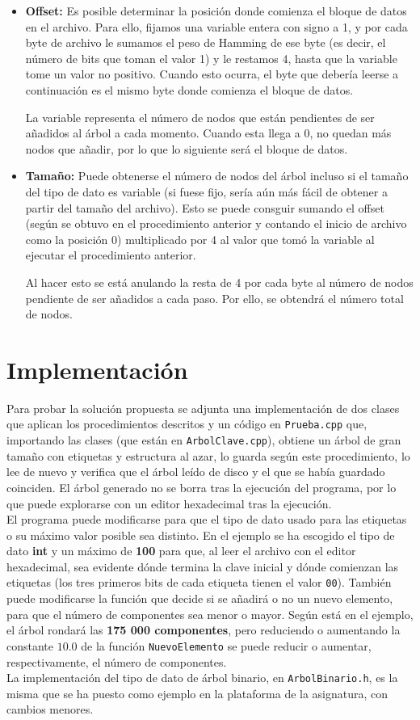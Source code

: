 \documentclass{article}
\begin{document}
\begin{itemize}
	\item \textbf{Offset:} Es posible determinar la posición donde comienza el
	bloque de datos en el archivo. Para ello, fijamos una variable entera con
	signo a 1, y por cada byte de archivo le sumamos el peso de Hamming de ese
	byte (es decir, el número de bits que toman el valor 1) y le restamos 4, hasta
	que la variable tome un valor no positivo. Cuando esto ocurra, el byte que
	debería leerse a continuación es el mismo byte donde comienza el bloque de
	datos.

	La variable representa el número de nodos que están pendientes de ser añadidos
	al árbol a cada momento. Cuando esta llega a 0, no quedan más nodos que añadir,
	por lo que lo siguiente será el bloque de datos.
	\item \textbf{Tamaño:} Puede obtenerse el número de nodos del árbol incluso
	si el tamaño del tipo de dato es variable (si fuese fijo, sería aún más fácil
	de obtener a partir del tamaño del archivo). Esto se puede consguir sumando el
	offset (según se obtuvo en el procedimiento anterior y contando el inicio de
	archivo como la posición 0) multiplicado por 4 al valor que tomó la variable al
	ejecutar el procedimiento anterior.

	Al hacer esto se está anulando la resta de 4 por cada byte al número de nodos
	pendiente de ser añadidos a cada paso. Por ello, se obtendrá el número total
	de nodos.
\end{itemize}

\section{Implementación}

Para probar la solución propuesta se adjunta una implementación de dos clases que
aplican los procedimientos descritos y un código en \texttt{Prueba.cpp} que,
importando las clases (que están en \texttt{ArbolClave.cpp}), obtiene un árbol de
gran tamaño con etiquetas y estructura al azar, lo guarda según este
procedimiento, lo lee de nuevo y verifica que el árbol leído de disco y el que se
había guardado coinciden. El árbol generado no se borra tras la ejecución del
programa, por lo que puede explorarse con un editor hexadecimal tras la ejecución.
\\

El programa puede modificarse para que el tipo de dato usado para las etiquetas o
su máximo valor posible sea distinto. En el ejemplo se ha escogido el tipo de dato
\textbf{int} y un máximo de \textbf{100} para que, al leer el archivo con el editor
hexadecimal, sea evidente dónde termina la clave inicial y dónde comienzan las
etiquetas (los tres primeros bits de cada etiqueta tienen el valor \texttt{00}).
También puede modificarse la función que decide si se añadirá o no un nuevo
elemento, para que el número de componentes sea menor o mayor. Según está en el
ejemplo, el árbol rondará las \textbf{175 000 componentes}, pero reduciendo o
aumentando la constante $10.0$ de la función \texttt{NuevoElemento} se puede
reducir o aumentar, respectivamente, el número de componentes. \\

La implementación del tipo de dato de árbol binario, en \texttt{ArbolBinario.h},
es la misma que se ha puesto como ejemplo en la plataforma de la asignatura, con
cambios menores.
\end{document}
